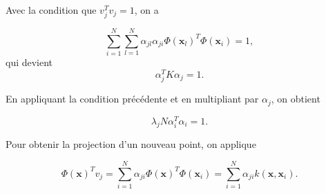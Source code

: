 Avec la condition que $v_j^Tv_j = 1$, on a 

$$\sum_{i = 1}^N \sum_{l = 1}^N \alpha_{jl}\alpha_{ji} \Phi(\textbf{x}_l)^T\Phi(\textbf{x}_ i) = 1,$$
qui devient
$$\alpha_j^T K \alpha_j = 1.$$

En appliquant la condition précédente et en multipliant par $\alpha_j$, on obtient

$$\lambda_j N \alpha_{i}^T \alpha_i = 1.$$

Pour obtenir la projection d'un nouveau point, on applique

$$\Phi(\textbf{x})^Tv_j = \sum_{i = 1}^{N}\alpha_{ji}\Phi(\textbf{x})^T\Phi(\textbf{x}_i) = \sum_{i = 1}^{N}\alpha_{ji}k(\textbf{x}, \textbf{x}_i).$$




